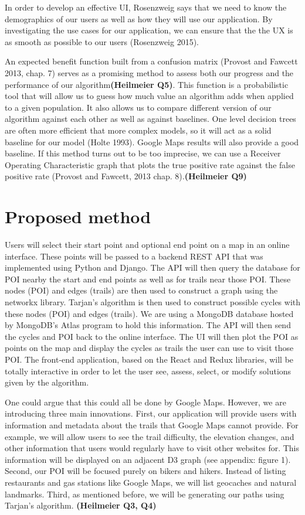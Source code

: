 \documentclass[sigconf]{acmart}
\begin{document}
In order to develop an effective UI, Rosenzweig says that we need to know the demographics of our users as well as how they will use our application. By investigating the use cases for our application, we can ensure that the the UX is as smooth as possible to our users (Rosenzweig 2015).

An expected benefit function built from a confusion matrix (Provost and Fawcett  2013, chap. 7) serves as a promising method to assess both our progress and the performance of our algorithm\textbf{(Heilmeier Q5)}. This function is a probabilistic tool that will allow us to guess how much value an algorithm adds when applied to a given population. It also allows us to compare different version of our algorithm against each other as well as against baselines. One level decision trees are often more efficient that more complex models, so it will act as a solid baseline for our model (Holte 1993). Google Maps results will also provide a good baseline.  If this method turns out to be too imprecise, we can use a Receiver Operating Characteristic graph that plots the true positive rate against the false positive rate (Provost and Fawcett, 2013 chap. 8).\textbf{(Heilmeier Q9)}

\section{Proposed method}
Users will select their start point and optional end point on a map in an online interface. These points will be passed to a backend REST API that was implemented using Python and Django. The API will then query the database for POI nearby the start and end points as well as for trails near those POI. These nodes (POI) and edges (trails) are then used to construct a graph using the networkx library. Tarjan's algorithm is then used to construct possible cycles with these nodes (POI) and edges (trails). We are using a MongoDB database hosted by MongoDB's Atlas program to hold this information. The API will then send the cycles and POI back to the online interface. The UI will then plot the POI as points on the map and display the cycles as trails the user can use to visit those POI. The front-end application, based on the React and Redux libraries, will be totally interactive in order to let the user see, assess, select, or modify solutions given by the algorithm.

One could argue that this could all be done by Google Maps. However, we are introducing three main innovations. First, our application will provide users with information and metadata about the trails that Google Maps cannot provide. For example, we will allow users to see the trail difficulty, the elevation changes, and other information that users would regularly have to visit other websites for. This information will be displayed on an adjacent D3 graph (see appendix: figure 1). Second, our POI will be focused purely on bikers and hikers. Instead of listing restaurants and gas stations like Google Maps, we will list geocaches and natural landmarks. Third, as mentioned before, we will be generating our paths using Tarjan's algorithm. \textbf{(Heilmeier Q3, Q4)}
\end{document}
